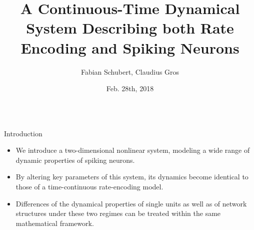 \documentclass{beamer}
\title{A Continuous-Time Dynamical System Describing both Rate Encoding and Spiking Neurons}
\author{Fabian Schubert, Claudius Gros}
\institute{Institute for Theoretical Physics, Goethe University Frankfurt a.M.}
\date[Feb. 28th, 2018]{Feb. 28th, 2018}
\begin{document}
\begin{frame}[t]
\begin{columns}
\begin{column}{.45\textwidth}

\begin{myblock}{Introduction}
\begin{itemize}
\item We introduce a two-dimensional nonlinear system, modeling a wide range of dynamic 
properties of spiking neurons.
\item By altering key parameters of this system, its dynamics become identical to those of a 
time-continuous rate-encoding model.
\item Differences of the dynamical properties of single units as well as of network structures under 
these two regimes can be treated within the same mathematical framework.
\end{itemize}
\end{myblock}


\end{column}
\end{columns}
\end{frame}
\end{document}
